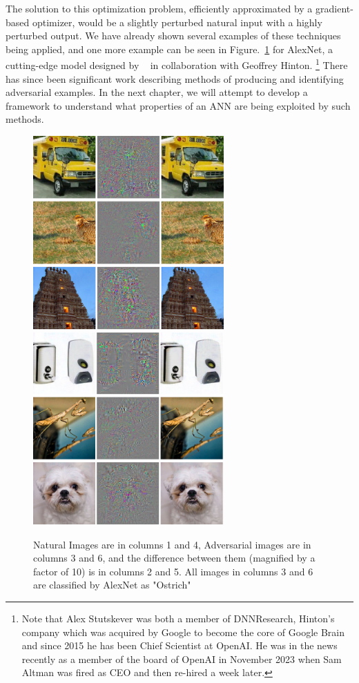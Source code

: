 The solution to this optimization
problem, efficiently approximated by a gradient-based optimizer, would
be a slightly perturbed natural input with a highly perturbed
output. We have already shown several examples of these techniques
being applied, and one more example can be seen in
Figure.~\ref{fig:my_label} for AlexNet, a cutting-edge model designed
by ~\citet{alexnet} in collaboration with Geoffrey Hinton. \footnote{Note that
Alex Stutskever was both a member of DNNResearch, Hinton's company
which was acquired by Google to become the core of Google Brain and
since 2015 he has been Chief Scientist at OpenAI. He was in the news
recently as a member of the board of OpenAI in November 2023 when Sam
Altman was fired as CEO and then re-hired a week later.} There has
since been significant work describing methods of producing and identifying
adversarial examples. In the next chapter, we will attempt to develop a
framework to understand what properties of an ANN are being exploited
by such methods.

\begin{figure}[ht]
   \centering
\includegraphics[width=7.3cm]{negative1.png}\includegraphics[width=7.3cm]{negative2.png}
   \caption{Natural Images are in columns 1 and 4, Adversarial images are in columns 3 and 6, and the difference between them (magnified by a factor of 10) is in columns 2 and 5. All images in columns 3 and 6 are classified by AlexNet as "Ostrich" ~\citep{szegedy2013}}
   \label{fig:my_label}
\end{figure}







